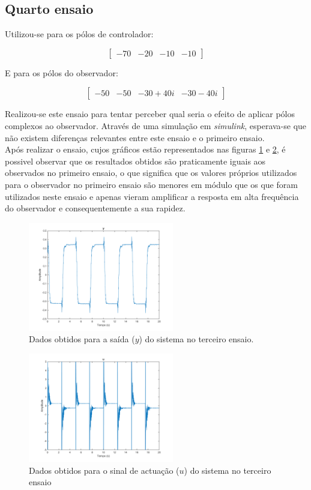 \documentclass[%
  reprint,
  nofootinbib,
  amsmath,amssymb,
  aps,
  10pt,
  a4paper
]{revtex4-1}
\begin{document}
\subsection{Quarto ensaio}

Utilizou-se para os pólos de controlador:

\begin{equation}
\begin{bmatrix}
-70 & -20 & -10 &-10
\end{bmatrix}
\end{equation}

E para os pólos do observador:

\begin{equation}
\begin{bmatrix}
-50 & -50 & -30+40i &-30-40i
\end{bmatrix}
\end{equation}

Realizou-se este ensaio para tentar perceber qual seria o efeito de aplicar pólos complexos ao observador. Através de uma simulação em {\it simulink}, esperava-se que não existem diferenças relevantes entre este ensaio e o primeiro ensaio.\\

Após realizar o ensaio, cujos gráficos estão representados nas figuras \ref{fig:y_f} e \ref{fig:u_f}, é possivel observar que os resultados obtidos são praticamente iguais aos observados no primeiro ensaio, o que significa que os valores próprios utilizados para o observador no primeiro ensaio são menores em módulo que os que foram utilizados neste ensaio e apenas vieram amplificar a resposta em alta frequência do observador e consequentemente a sua rapidez.

\begin{figure}[t]
\includegraphics[width=2.5in]{../imgs/dados_00_f/dados_00_f_y.png}
\caption{Dados obtidos para a saída ($y$) do sistema no terceiro ensaio.}
\label{fig:y_f}
\end{figure}
\begin{figure}[t]
\includegraphics[width=2.5in]{../imgs/dados_00_f/dados_00_f_u.png}
\caption{Dados obtidos para o sinal de actuação ($u$) do sistema no terceiro ensaio}
\label{fig:u_f}
\end{figure}
\end{document}
